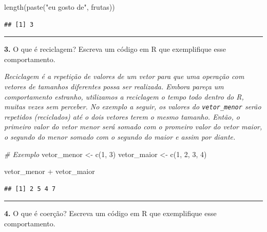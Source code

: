 \documentclass[
]{book}
\newenvironment{Shaded}{\begin{snugshade}}{\end{snugshade}}
\newcommand{\CommentTok}[1]{\textcolor[rgb]{0.56,0.35,0.01}{\textit{#1}}}
\newcommand{\DecValTok}[1]{\textcolor[rgb]{0.00,0.00,0.81}{#1}}
\newcommand{\FunctionTok}[1]{\textcolor[rgb]{0.00,0.00,0.00}{#1}}
\newcommand{\NormalTok}[1]{#1}
\newcommand{\OtherTok}[1]{\textcolor[rgb]{0.56,0.35,0.01}{#1}}
\newcommand{\SpecialCharTok}[1]{\textcolor[rgb]{0.00,0.00,0.00}{#1}}
\newcommand{\StringTok}[1]{\textcolor[rgb]{0.31,0.60,0.02}{#1}}
\begin{document}
\begin{Shaded}
\begin{Highlighting}[]
\FunctionTok{length}\NormalTok{(}\FunctionTok{paste}\NormalTok{(}\StringTok{"eu gosto de"}\NormalTok{, frutas))}
\end{Highlighting}
\end{Shaded}

\begin{verbatim}
## [1] 3
\end{verbatim}

\begin{center}\rule{0.5\linewidth}{0.5pt}\end{center}

\textbf{3.} O que é reciclagem? Escreva um código em R que exemplifique esse comportamento.

\emph{Reciclagem é a repetição de valores de um vetor para que uma operação com vetores de tamanhos diferentes possa ser realizada. Embora pareça um comportamento estranho, utilizamos a reciclagem o tempo todo dentro do R, muitas vezes sem perceber. No exemplo a seguir, os valores do \texttt{vetor\_menor} serão repetidos (reciclados) até o dois vetores terem o mesmo tamanho. Então, o primeiro valor do vetor menor será somado com o promeiro valor do vetor maior, o segundo do menor somado com o segundo do maior e assim por diante.}

\begin{Shaded}
\begin{Highlighting}[]
\CommentTok{\# Exemplo}
\NormalTok{vetor\_menor }\OtherTok{\textless{}{-}} \FunctionTok{c}\NormalTok{(}\DecValTok{1}\NormalTok{, }\DecValTok{3}\NormalTok{)}
\NormalTok{vetor\_maior }\OtherTok{\textless{}{-}} \FunctionTok{c}\NormalTok{(}\DecValTok{1}\NormalTok{, }\DecValTok{2}\NormalTok{, }\DecValTok{3}\NormalTok{, }\DecValTok{4}\NormalTok{)}

\NormalTok{vetor\_menor }\SpecialCharTok{+}\NormalTok{ vetor\_maior}
\end{Highlighting}
\end{Shaded}

\begin{verbatim}
## [1] 2 5 4 7
\end{verbatim}

\begin{center}\rule{0.5\linewidth}{0.5pt}\end{center}

\textbf{4.} O que é coerção? Escreva um código em R que exemplifique esse comportamento.
\end{document}
